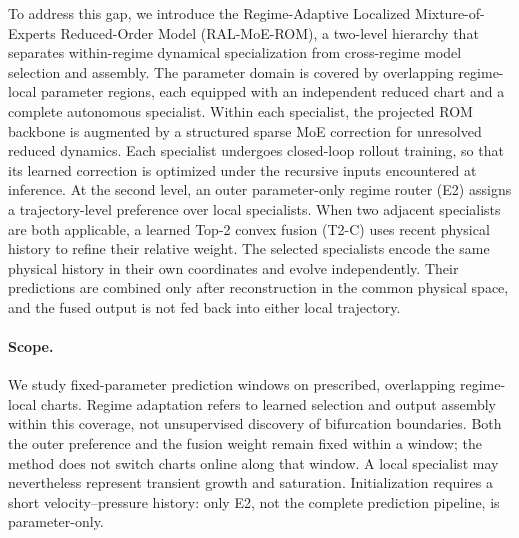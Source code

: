 \documentclass{article}
\providecommand{\DIFaddtex}[1]{{\protect\color{blue} \sf #1}} %
\providecommand{\DIFaddbegin}{} %
\providecommand{\DIFadd}[1]{\texorpdfstring{\DIFaddtex{#1}}{#1}} %
\providecommand{\DIFaddincludegraphics}[2][]{{\color{blue}\fbox{\DIFOincludegraphics[#1]{#2}}}} %
\DeclareRobustCommand{\DIFaddbegin}{\DIFOaddbegin \let\includegraphics\DIFaddincludegraphics} %
\begin{document}
To address this gap, we introduce the Regime-Adaptive Localized Mixture-of-Experts Reduced-Order Model (RAL-MoE-ROM), a two-level hierarchy that separates within-regime dynamical specialization from cross-regime model selection and assembly. The parameter domain is covered by overlapping regime-local parameter regions, each equipped with an independent reduced chart and a complete autonomous specialist. Within each specialist, the projected ROM backbone is augmented by a structured sparse MoE correction for unresolved reduced dynamics. Each specialist undergoes closed-loop rollout training, so that its learned correction is optimized under the recursive inputs encountered at inference. At the second level, an outer parameter-only regime router (E2) assigns a trajectory-level preference over local specialists. When two adjacent specialists are both applicable, a learned Top-2 convex fusion (T2-C) uses recent physical history to refine their relative weight. The selected specialists encode the same physical history in their own coordinates and evolve independently. Their predictions are combined only after reconstruction in the common physical space, and the fused output is not fed back into either local trajectory.


\DIFaddbegin \paragraph{\DIFadd{Scope.}}
\DIFadd{We study fixed-parameter prediction windows on prescribed, overlapping regime-local charts. Regime adaptation refers to learned selection and output assembly within this coverage, not unsupervised discovery of bifurcation boundaries. Both the outer preference and the fusion weight remain fixed within a window; the method does not switch charts online along that window. A local specialist may nevertheless represent transient growth and saturation. Initialization requires a short velocity--pressure history: only E2, not the complete prediction pipeline, is parameter-only.
}
\end{document}
